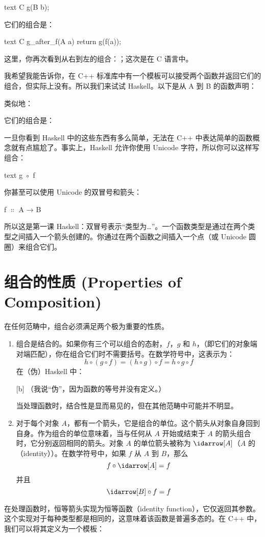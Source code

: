 \begin{snip}{text}
  C g(B b);
\end{snip}
它们的组合是：

\begin{snip}{text}
  C g_after_f(A a)
    {
    return g(f(a));
  }
\end{snip}
这里，你再次看到从右到左的组合：；这次是在 C 语言中。

我希望我能告诉你，在 C++ 标准库中有一个模板可以接受两个函数并返回它们的组合，但实际上没有。所以我们来试试 Haskell。以下是从 A 到 B 的函数声明：

类似地：

它们的组合是：

一旦你看到 Haskell 中的这些东西有多么简单，无法在 C++ 中表达简单的函数概念就有点尴尬了。事实上，Haskell 允许你使用 Unicode 字符，所以你可以这样写组合：
\begin{snip}{text}
  g ◦ f
\end{snip}

你甚至可以使用 Unicode 的双冒号和箭头：
\begin{snipv}
  f \ensuremath{\Colon} A → B
\end{snipv}
所以这是第一课 Haskell：双冒号表示“类型为\ldots{}”。一个函数类型是通过在两个类型之间插入一个箭头创建的。你通过在两个函数之间插入一个点（或 Unicode 圆圈）来组合它们。

\section{组合的性质 (Properties of Composition)}

在任何范畴中，组合必须满足两个极为重要的性质。

\begin{enumerate}
  \item
  组合是结合的。如果你有三个可以组合的态射，$f$，$g$ 和 $h$，（即它们的对象端对端匹配），你在组合它们时不需要括号。在数学符号中，这表示为：
  \[h \circ (g \circ f) = (h \circ g) \circ f = h \circ g \circ f\]
  在（伪）Haskell 中：

  [b]
  （我说“伪”，因为函数的等号并没有定义。）

  当处理函数时，结合性是显而易见的，但在其他范畴中可能并不明显。

  \item
  对于每个对象 $A$，都有一个箭头，它是组合的单位。这个箭头从对象自身回到自身。作为组合的单位意味着，当与任何从 $A$ 开始或结束于 $A$ 的箭头组合时，它分别返回相同的箭头。对象 $A$ 的单位箭头被称为 $\idarrow[A]$（$A$ 的（identity））。在数学符号中，如果 $f$ 从 $A$ 到 $B$，那么
  \[f \circ \idarrow[A] = f\]
  并且
  \[\idarrow[B] \circ f = f\]
\end{enumerate}
在处理函数时，恒等箭头实现为恒等函数（identity function），它仅返回其参数。这个实现对于每种类型都是相同的，这意味着该函数是普遍多态的。在 C++ 中，我们可以将其定义为一个模板：

